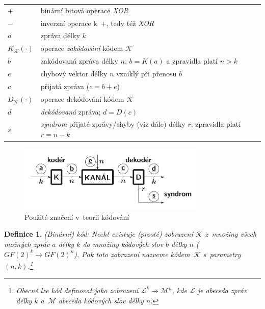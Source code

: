 \documentclass[thesis=M,czech,hidelinks]{FITthesis}[2012/06/26]
\newcommand{\0}{{\textcolor[gray]{0.75}{0}}}
\newtheorem{definice}{Definice}
\begin{document}
\begin{center}
\begin{tabular}{l p{10cm}}
    $+$     &   binární bitová operace \emph{XOR} \\
    $-$     &   inverzní operace k~$+$, tedy též \emph{XOR} \\
    $a$     &   zpráva délky $k$ \\
    $K_{\mathcal{K}}(\cdot)$ &   operace \emph{zakódování} kódem $\mathcal{K}$ \\
    $b$     &   zakódovaná zpráva délky $n$; $b=K(a)$ a zpravidla platí $n>k$ \\
    $e$     &   chybový vektor délky $n$ vzniklý při přenosu $b$ \\
    $c$     &   přijatá zpráva ($c=b+e$) \\
    $D_{\mathcal{K}}(\cdot)$ &   operace dekódování kódem $\mathcal{K}$ \\
    $d$     &   \emph{dekódovaná} zpráva; $d=D(c)$ \\
    $s$     &   \emph{syndrom} přijaté zprávy/chyby (viz dále) délky $r$;
                zpravidla platí $r=n-k$ \\
\end{tabular}
\end{center}

\begin{figure}
    \centering
    \includegraphics[width=0.8\textwidth]{materialy/aak-kodovani.png}
    \caption[Značení v~teorii kódování]{Použité značení v~teorii kódování~\cite{FIT_AAK}}
    \label{obr_kodovani}
\end{figure}


\begin{definice}{(Binární) kód:}
    Nechť existuje (prosté) zobrazení $\mathcal{K}$ z~množiny všech možných
    zpráv $a$ délky $k$ do množiny kódových slov $b$ délky $n$
    ($GF(2)^k \rightarrow GF(2)^n$). Pak toto zobrazení nazveme
    kódem~$\mathcal{K}$ s~parametry $(n,k)$.\footnote{
        Obecně lze \emph{kód} definovat jako zobrazení $\mathcal{L}^k
        \rightarrow \mathcal{M}^n$, kde $\mathcal{L}$ je \emph{abeceda} zpráv
        délky $k$ a~$\mathcal{M}$ abeceda kódových slov délky $n$.
    }
\end{definice}
\end{document}
